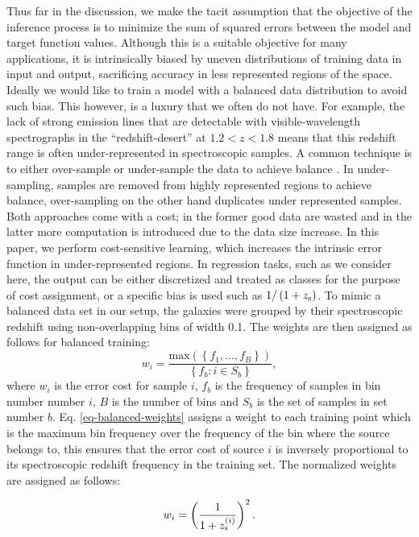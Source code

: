 \documentclass[useAMS,usenatbib,fleqn]{mn2e}
\begin{document}
Thus far in the discussion, we make the tacit assumption that the objective of the inference process is to minimize the sum of squared errors between the model and target function values. Although this is a suitable objective for many applications, it is intrinsically biased by uneven distributions of training data in input and output, sacrificing accuracy in less represented regions of the space. Ideally we would like to train a model with a balanced data distribution to avoid such bias. This however, is a luxury that we often do not have. For example, the lack of strong emission lines that are detectable with visible-wavelength spectrographs in the ``redshift-desert'' at $1.2 < z <1.8$ means that this redshift range is often under-represented in spectroscopic samples. A common technique is to either over-sample or under-sample the data to achieve balance \citep{weiss2007}. In under-sampling, samples are removed from highly represented regions to achieve balance, over-sampling on the other hand duplicates under represented samples. Both approaches come with a cost; in the former good data are wasted and in the latter more computation is introduced due to the data size increase. In this paper, we perform cost-sensitive learning, which increases the intrinsic error function in under-represented regions. In regression tasks, such as we consider here, the output can be either discretized and treated as classes for the purpose of cost assignment, or a specific bias is used such as $1/\left(1+z_{\rm s}\right)$. To mimic a balanced data set in our setup, the galaxies were grouped by their spectroscopic redshift using non-overlapping bins of width 0.1. The weights are then assigned as follows for balanced training:
\begin{equation}
\label{eq-balanced-weights}
w_{i} = \frac{\mbox{max}\left(\left \{f_{1},\hdots,f_{B}\right\}\right)}{\left\{f_{b}:i\in S_{b}\right\}},
\end{equation}
where $w_{i}$ is the error cost for sample $i$, $f_{b}$ is the frequency of samples in bin number number $i$, $B$ is the number of bins and $S_{b}$ is the set of samples in set number $b$. Eq. \eqref{eq-balanced-weights} assigns a weight to each training point which is the maximum bin frequency over the frequency of the bin where the source belongs to, this ensures that the error cost of source $i$ is inversely proportional to its spectroscopic redshift frequency in the training set. The normalized weights are assigned as follows:

\begin{equation}
\label{eq-normalized-weights}
w_{i} = \left(\frac{1}{1+z_{\rm s}^{\left(i\right)}}\right)^{2}.
\end{equation}
\end{document}

